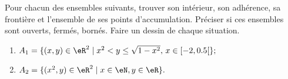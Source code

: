 \begin{exercice}\label{exocontrolecontinu0001}

Pour chacun des ensembles suivants, trouver son intérieur, son adhérence, sa frontière et l'ensemble de ses points d'accumulation. Préciser si ces ensembles sont ouverts, fermés, bornés. Faire un dessin de chaque situation.

	\begin{enumerate}
		\item	
 $A_1 = \{ (x, y ) \in \eR^2 \; | \; x^2<y\leq \sqrt{1- x^2},\, x\in [-2, 0.5[ \} ;$
               
                \item
$A_2 = \{ (x^2, y ) \in \eR^2 \; | \; x \in \eN , y \in \eR \}. $
	\end{enumerate}

\end{exercice}
